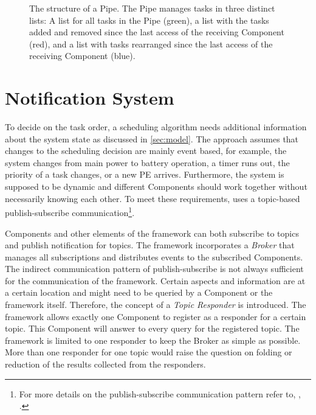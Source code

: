 \begin{figure}[t!] \centering
	\caption[The structure of a \cobas{} Pipe.]{The structure of a \cobas{} Pipe. The Pipe manages tasks in three distinct lists: A list for all tasks in the Pipe (green), a list with the tasks added and removed since the last access of the receiving Component (red), and a list with tasks rearranged since the last access of the receiving Component (blue).}%
	\label{fig:arch:pipe}
\end{figure}

\section{Notification System}%
\label{sec:arch:notifications}

To decide on the task order, a scheduling algorithm needs additional information about the system state as discussed in \cref{sec:model}. The \cobas{} approach assumes that changes to the scheduling decision are mainly event based, for example, the system changes from main power to battery operation, a timer runs out, the priority of a task changes, or a new \ac{PE} arrives. Furthermore, the system is supposed to be dynamic and different Components should work together without necessarily knowing each other. To meet these requirements, \cobas{} uses a topic-based publish-subscribe communication\footnote{For more details on the publish-subscribe communication pattern refer to, \eg{}, \textcite{Eugster-2003-PubSub}.}.

Components and other elements of the \cobas{} framework can both subscribe to topics and publish notification for topics. The \cobas{} framework incorporates a \emph{Broker} that manages all subscriptions and distributes events to the subscribed Components. The indirect communication pattern of publish-subscribe is not always sufficient for the communication of the framework. Certain aspects and information are at a certain location and might need to be queried by a Component or the framework itself. Therefore, the concept of a \emph{Topic Responder} is introduced. The framework allows exactly one Component to register as a responder for a certain topic. This Component will answer to every query for the registered topic. The framework is limited to one responder to keep the Broker as simple as possible. More than one responder for one topic would raise the question on folding or reduction of the results collected from the responders.

